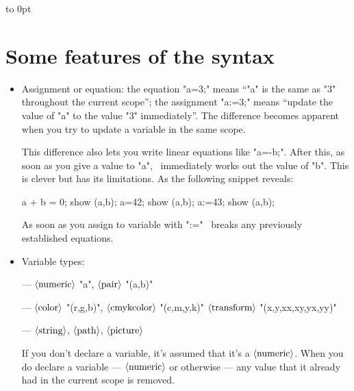 \documentclass[a4paper,landscape]{article}
\def\mwpic#1#2{\vadjust{\moveright5.5in\vbox to 0pt{\hsize4in\vskip#1\centerline{\texttt{[image: \#2]}}\vss}}}
\def\<#1>{\ensuremath{\langle\hbox{#1}\rangle}}
\begin{document}
\vbox to 0pt{
\vskip 1in
\noindent
\begingroup\footnotesize{}\endgroup\par\vss}

\newpage
\section{Some features of the syntax}

\begin{itemize}
    \item Assignment or equation:  the equation "a=3;" means “"a" is the same as "3" throughout the
        current scope”; the assignment "a:=3;" means “update the value of "a" to the value "3"
        immediately”.  The difference becomes apparent when you try to update a
        variable in the same scope.
        \mwpic{0pt}{tiling}

        This difference also lets you write linear equations
        like "a=-b;".  After this, as soon as you give  a value to "a", \MP\ immediately works
        out the value of "b".
        This is clever but has its limitations.  As the following snippet reveals:
\begin{code}
  a + b = 0; show (a,b);  %
  a=42;      show (a,b);  %
  a:=43;     show (a,b);  %
\end{code}
        As soon as you assign to variable with ":=" \MP\ breaks any previously
        established equations.

    \item Variable types:

        —
        \<numeric> "a",
        \<pair> "(a,b)"

        —
        \<color> "(r,g,b)",
        \<cmykcolor> "(c,m,y,k)"
        \<transform> "(x,y,xx,xy,yx,yy)"

        —
        \<string>,
        \<path>,
        \<picture>


        If you don’t declare a variable, it’s assumed that it’s a \<numeric>.
        When you do declare a variable --- \<numeric> or otherwise — any value that it
       already had in the current scope is removed.


\end{itemize}
\end{document}
